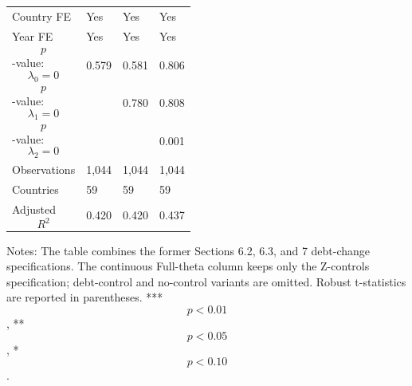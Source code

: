 \begin{table}[H]
\begin{threeparttable}
\begin{tabularx}{\textwidth}{lYYY}
Country FE & Yes & Yes & Yes \\
Year FE & Yes & Yes & Yes \\
$$p$$-value: $$\lambda_0=0$$ & 0.579 & 0.581 & 0.806 \\
$$p$$-value: $$\lambda_1=0$$ &  & 0.780 & 0.808 \\
$$p$$-value: $$\lambda_2=0$$ &  &  & 0.001 \\
Observations & 1,044 & 1,044 & 1,044 \\
Countries & 59 & 59 & 59 \\
Adjusted $$R^2$$ & 0.420 & 0.420 & 0.437 \\
\bottomrule
\end{tabularx}
\begin{tablenotes}[flushleft]\footnotesize
\item Notes: The table combines the former Sections 6.2, 6.3, and 7 debt-change specifications. The continuous Full-theta column keeps only the Z-controls specification; debt-control and no-control variants are omitted. Robust t-statistics are reported in parentheses. *** $$p<0.01$$, ** $$p<0.05$$, * $$p<0.10$$.
\end{tablenotes}
\end{threeparttable}
\end{table}
